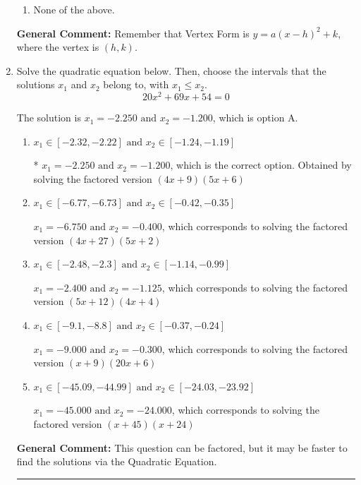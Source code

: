 \documentclass{extbook}[14pt]
\newcommand{\litem}[1]{\item #1

\rule{\textwidth}{0.4pt}}
\begin{document}
\begin{enumerate}
{\begin{enumerate}[label=\Alph*.]
\begin{multicols}{2}
\end{multicols}\item None of the above.\end{enumerate}
\textbf{General Comment:} Remember that Vertex Form is $y = a(x-h)^2+k$, where the vertex is $(h, k)$.
}
\litem{
Solve the quadratic equation below. Then, choose the intervals that the solutions $x_1$ and $x_2$ belong to, with $x_1 \leq x_2$.
\[ 20x^{2} +69 x + 54 = 0 \]

The solution is \( x_1 = -2.250 \text{ and } x_2 = -1.200 \), which is option A.\begin{enumerate}[label=\Alph*.]
\item \( x_1 \in [-2.32, -2.22] \text{ and } x_2 \in [-1.24, -1.19] \)

* $x_1 = -2.250 \text{ and } x_2 = -1.200$, which is the correct option. Obtained by solving the factored version $(4x + 9)(5x + 6)$
\item \( x_1 \in [-6.77, -6.73] \text{ and } x_2 \in [-0.42, -0.35] \)

$x_1 = -6.750 \text{ and } x_2 = -0.400$, which corresponds to solving the factored version $(4x + 27)(5x + 2)$
\item \( x_1 \in [-2.48, -2.3] \text{ and } x_2 \in [-1.14, -0.99] \)

$x_1 = -2.400 \text{ and } x_2 = -1.125$, which corresponds to solving the factored version $(5x + 12)(4x + 4)$
\item \( x_1 \in [-9.1, -8.8] \text{ and } x_2 \in [-0.37, -0.24] \)

$x_1 = -9.000 \text{ and } x_2 = -0.300$, which corresponds to solving the factored version $(x + 9)(20x + 6)$
\item \( x_1 \in [-45.09, -44.99] \text{ and } x_2 \in [-24.03, -23.92] \)

$x_1 = -45.000 \text{ and } x_2 = -24.000$, which corresponds to solving the factored version $(x + 45)(x + 24)$
\end{enumerate}

\textbf{General Comment:} This question can be factored, but it may be faster to find the solutions via the Quadratic Equation.
}
\end{enumerate}
\end{document}
